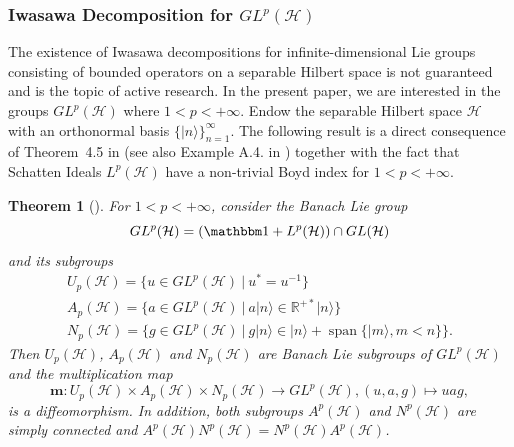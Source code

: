 \documentclass[a4paper,12pt,reqno]{amsart}%
\newtheorem{theorem}{Theorem}
\theoremstyle{definition}
\theoremstyle{remark}
\numberwithin{theorem}{section}
\numberwithin{equation}{section}
\newcommand{\1}{{\bf 1}}
\newcommand{\Id}{\mathbbm 1}
\begin{document}
\subsubsection{Iwasawa Decomposition for $GL^p(\mathcal H)$}
The existence of Iwasawa decompositions for infinite-dimensional Lie groups consisting of bounded operators on a separable Hilbert space is not guaranteed and is the topic of active research.
In the present paper, we are interested in the groups $GL^p(\mathcal H)$ where $1<p<+\infty$. Endow the separable Hilbert space $\mathcal{H}$ with an orthonormal basis $\{|n\rangle\}_{n=1}^{\infty}$. The following result is a direct consequence of Theorem~4.5 in \cite{beltita-iwasawa} (see also Example A.4. in \cite{beltita-iwasawa})
together with the fact that Schatten Ideals $L^p(\mathcal{H})$ have a non-trivial Boyd index \cite[Section~2]{beltita2010} for $1<p<+\infty$.

\begin{theorem}[{\cite[Theorem~4.5]{beltita-iwasawa}}]\label{thm:Iwasawa}
    For $1<p<+\infty$, consider the Banach Lie group  \[GL^p(\mathcal H) = (\Id + L^p(\mathcal H))\cap GL(\mathcal H)\]
    and its subgroups
    \[
    \begin{array}{l}
    U_p(\mathcal{H}) = \{u \in GL^p(\mathcal H)~|~ u^* = u^{-1}\}\\
    A_p(\mathcal{H}) = \{ a \in GL^p(\mathcal H)~|~ a|n\rangle \in \mathbb{R}^{+*}|n\rangle\}\\
    N_p(\mathcal{H}) = \{ g \in GL^p(\mathcal H)~|~  g|n\rangle \in |n\rangle + \operatorname{span}\{|m\rangle, m<n\}\}.  
    \end{array}
    \]
    Then $U_p(\mathcal{H})$, $A_p(\mathcal{H})$ and $N_p(\mathcal{H})$ are Banach Lie subgroups of $GL^p(\mathcal H)$ and the multiplication map
    \[
\textbf{m}:U_p(\mathcal{H})\times A_p(\mathcal{H})\times N_p(\mathcal{H})\rightarrow GL^p(\mathcal H), (u, a, g)\mapsto uag,
    \]
    is a diffeomorphism. In addition, both subgroups $A^p(\mathcal{H})$ and $N^p(\mathcal{H})$ are simply connected
and $A^p(\mathcal{H})N^p(\mathcal{H})= N^p(\mathcal{H})A^p(\mathcal{H})$.
\end{theorem}
\end{document}
